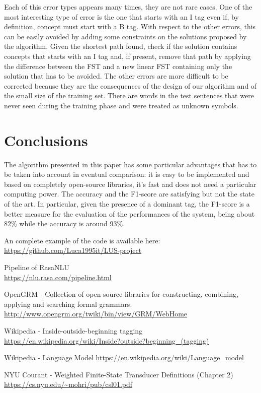 \documentclass[11pt,a4paper]{article}
\begin{document}
Each of this error types appears many times, they are not rare cases. One of the most interesting type of error is the one that starts with an I tag even if, by definition, concept must start with a B tag. With respect to the other errors, this can be easily avoided by adding some constraints on the solutions proposed by the algorithm. Given the shortest path found, check if the solution contains concepts that starts with an I tag and, if present, remove that path by applying the difference between the FST and a new linear FST containing only the solution that has to be avoided.
The other errors are more difficult to be corrected because they are the consequences of the design of our algorithm and of the small size of the training set. There are words in the test sentences that were never seen during the training phase and were treated as unknown symbols.

\section{Conclusions}

The algorithm presented in this paper has some particular advantages that has to be taken into account in eventual comparison: it is easy to be implemented and based on completely open-source libraries, it's fast and does not need a particular computing power. The accuracy and the F1-score are satisfying but not the state of the art. In particular, given the presence of a dominant tag, the F1-score is a better measure for the evaluation of the performances of the system, being about 82\% while the accuracy is around 93\%.

An complete example of the code is available here: \url{https://github.com/Luca1995it/LUS-project}

\bigskip


\begin{thebibliography}{2}

Pipeline of RasaNLU \\
\url{https://nlu.rasa.com/pipeline.html}

OpenGRM - Collection of open-source libraries for constructing, combining, applying and searching formal grammars.
\url{http://www.opengrm.org/twiki/bin/view/GRM/WebHome}

Wikipedia - Inside-outside-beginning tagging
\url{https://en.wikipedia.org/wiki/Inside?outside?beginning_(tagging)}

Wikipedia - Language Model
\url{https://en.wikipedia.org/wiki/Language_model}

NYU Courant - Weighted Finite-State Transducer Definitions (Chapter 2)
\url{https://cs.nyu.edu/~mohri/pub/csl01.pdf}


\end{thebibliography}
\end{document}
